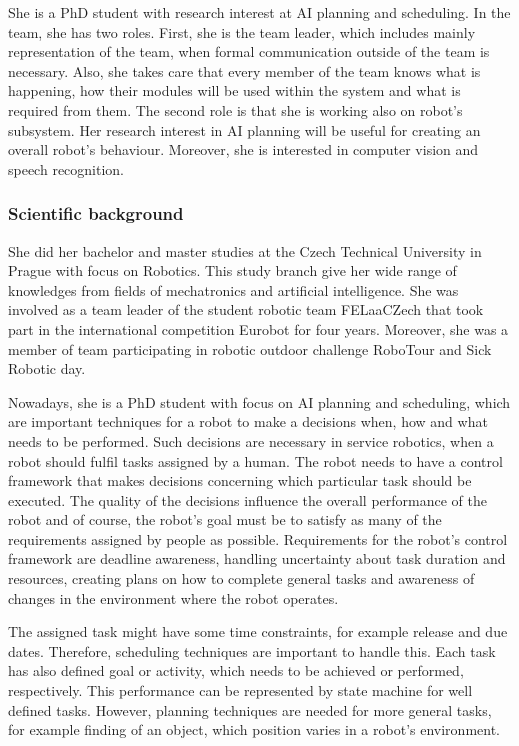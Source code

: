 \documentclass[conference]{IEEEtran}
\begin{document}
She is a PhD student with research interest at AI planning and scheduling. In the team, she has two roles. First, she is the team leader, which includes mainly representation of the team, when formal communication outside of the team is necessary. Also, she takes care that every member of the team knows what is happening, how their modules will be used within the system and what is required from them. The second role is that she is working also on robot's subsystem. Her research interest in AI planning will be useful for creating an overall robot's behaviour. Moreover, she is interested in computer vision and speech recognition. 

\subsubsection*{Scientific background}
She did her bachelor and master studies at the Czech Technical University in Prague with focus on Robotics. This study branch give her wide range of knowledges from fields of mechatronics and artificial intelligence. She was involved as a team leader of the student robotic team FELaaCZech that took part in the international competition Eurobot for four years. Moreover, she was a member of team participating in robotic outdoor challenge RoboTour and Sick Robotic day. 

Nowadays, she is a PhD student with focus on AI planning and scheduling, which are important techniques for a robot to make a decisions when, how and what needs to be performed. Such decisions are necessary in service robotics, when a robot should fulfil tasks assigned by a human. 
The robot needs to have a control framework that makes decisions concerning which particular task should be executed. The quality of the decisions influence the overall performance of the robot and of course, the robot's goal must be to satisfy as many of the requirements assigned by people as possible. Requirements for the robot's control framework are deadline awareness, handling uncertainty about task duration and resources, creating plans on how to complete general tasks and awareness of changes in the environment where the robot operates. 

The assigned task might have some time constraints, for example release and due dates. Therefore, scheduling techniques are important to handle this. Each task has also defined goal or activity, which needs to be achieved or performed, respectively. This performance can be represented by state machine for well defined tasks. However, planning techniques are needed for more general tasks, for example finding of an object, which position varies  in a robot's environment.
\end{document}

